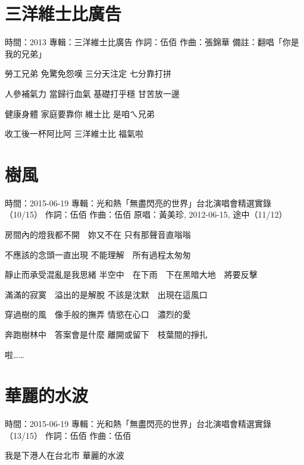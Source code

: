 \documentclass[UTF8,a4paper,oneside,twocolumn,12pt]{ctexbook}
\newcommand{\infopair}[2]{\textbullet #1：#2}
\newcommand{\zc}[1][伍佰]{\infopair{作詞}{#1}}
\newcommand{\zq}[1][伍佰]{\infopair{作曲}{#1}}
\newcommand{\zj}[1]{\infopair{專輯}{#1}}
\newcommand{\yc}[1]{\infopair{原唱}{#1}}
\newcommand{\sj}[1]{\infopair{時間}{#1}}
\newcommand{\bz}[1]{\infopair{備註}{#1}}
\newenvironment{info}{\begin{flushleft}\kaishu
	}
	{\end{flushleft}\normalsize\yahei\par}
\newenvironment{lyric}{
	}
{}
\begin{document}
\section{三洋維士比廣告} %
\begin{info}
	\sj{2013}
	\zj{三洋維士比廣告}
	\zc[伍佰]
	\zq[張錦華]
	\bz{翻唱「你是我的兄弟」}
\end{info}
\begin{lyric}
	勞工兄弟 免驚免怨嘆
	三分天注定 七分靠打拼

	人參補氣力 當歸行血氣
	基礎打乎穩 甘苦放一邊

	健康身體 家庭要靠你
	維士比 是咱ㄟ兄弟

	收工後一杯阿比阿 三洋維士比 福氣啦
\end{lyric}

\section{樹風}
\begin{info}
	\sj{2015-06-19}
	\zj{光和熱「無盡閃亮的世界」台北演唱會精選實錄（10/15）}
	\zc
	\zq
	\yc{黃美珍, 2012-06-15, 途中（11/12）}
\end{info}
\begin{lyric}
	房間內的燈我都不開　妳又不在
	只有那聲音直嗡嗡

	不應該的念頭一直出現
	不能理解　所有過程太匆匆

	靜止而承受混亂是我思緒
	半空中　在下雨　下在黑暗大地　將要反擊

	滿滿的寂寞　溢出的是解脫
	不該是沈默　出現在這風口

	穿過樹的風　像手般的撫弄
	情慾在心口　濃烈的愛

	奔跑樹林中　答案會是什麼
	離開或留下　枝葉間的掙扎

	啦……
\end{lyric}

\section{華麗的水波}
\begin{info}
	\sj{2015-06-19}
	\zj{光和熱「無盡閃亮的世界」台北演唱會精選實錄（13/15）}
	\zc
	\zq
\end{info}
\begin{lyric}
	我是下港人在台北市
	華麗的水波
\end{lyric}
\end{document}
